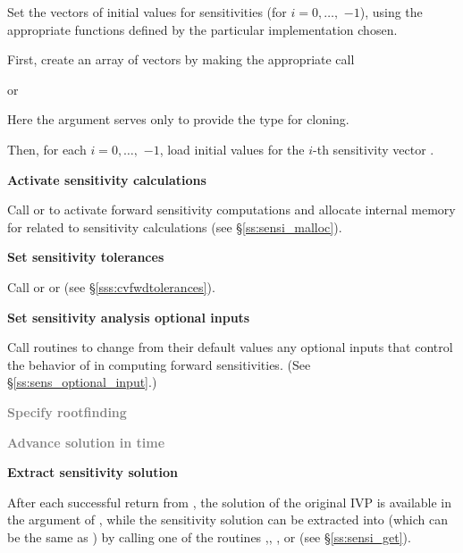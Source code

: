 \begin{Steps}
  Set the  vectors  of initial values
  for sensitivities (for $i=0,\ldots,$  $ - 1$), using the
  appropriate functions defined by the particular {\nvector} implementation chosen.

  First, create an array of  vectors by making the appropriate call


  or


  Here the argument  serves only to provide the 
  type for cloning.

  Then, for each $i = 0,\ldots, $ $ - 1$, load initial values
  for the $i$-th sensitivity vector .

\item
  {\bf Activate sensitivity calculations}

  Call  or  to activate forward 
  sensitivity computations and allocate internal memory for {\cvodes} related 
  to sensitivity calculations (see \S\ref{ss:sensi_malloc}).

\item
  {\bf Set sensitivity tolerances}

  Call  or  or
   (see \S\ref{sss:cvfwdtolerances}).

\item
  {\bf Set sensitivity analysis optional inputs}

  Call  routines to change from their default values any
  optional inputs that control the behavior of {\cvodes} in computing forward 
  sensitivities.  (See \S\ref{ss:sens_optional_input}.)

\item
  \textcolor{gray}{\bf Specify rootfinding}

\item
  \textcolor{gray}{\bf Advance solution in time}

\item
  {\bf Extract sensitivity solution}

  After each successful return from , the solution of the
  original IVP is available in the  argument of ,
  while the sensitivity solution can be extracted into  (which can 
  be the same as ) by calling one of the routines 
  ,, , or 
  (see \S\ref{ss:sensi_get}).


\end{Steps}
